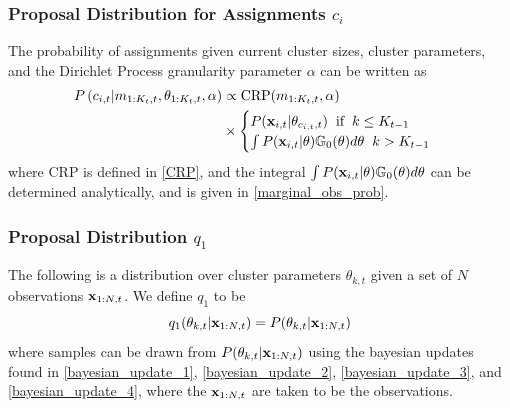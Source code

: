 \documentclass[smallcondensed, final]{svjour3}
\begin{document}
\subsubsection{Proposal Distribution for Assignments $c_{i}$}
\label{sec:smc_proposal_1}

The probability of assignments given current cluster sizes, cluster parameters, and the Dirichlet Process granularity parameter $\alpha$ can be written as
\begin{equation}
\label{smc_assig_eqn}
\begin{split}
P \left( c_{i,t} | m_{1:K_{t}, t}, \theta_{1:K_{t}, t}, \alpha \right) &\propto
\text{CRP}(m_{1:K_{t}, t}, \alpha) \\ &\times
\begin{cases}
P(\bold{x}_{i,t} | \theta_{c_{i,t},t}) \hspace{2mm} \text{if} \hspace{2mm} k \leq K_{t-1} \\
\int P(\bold{x}_{i,t} | \theta) \mathbb{G}_{0}(\theta)d\theta \hspace{2mm} k > K_{t-1}
\end{cases}
\end{split}
\end{equation}
where CRP is defined in \eqref{CRP}, and the integral $\int P(\bold{x}_{i,t} | \theta) \mathbb{G}_{0}(\theta)d\theta$ can be determined analytically, and is given in \eqref{marginal_obs_prob}.





\subsubsection{Proposal Distribution $q_{1}$}
\label{sec:smc_proposal_2}

The following is a distribution over cluster parameters $\theta_{k,t}$ given a set of $N$ observations $\bold{x}_{1:N, t}$. We define $q_{1}$ to be
\begin{equation}
\label{smc_q1_eqn}
q_{1}(\theta_{k,t} | \bold{x}_{1:N,t}) = P(\theta_{k,t} | \bold{x}_{1:N,t})
\end{equation}
where samples can be drawn from $P(\theta_{k,t} | \bold{x}_{1:N,t})$ using the bayesian updates found in \eqref{bayesian_update_1}, \eqref{bayesian_update_2}, \eqref{bayesian_update_3}, and \eqref{bayesian_update_4}, where the $\bold{x}_{1:N,t}$ are taken to be the observations.
\end{document}

